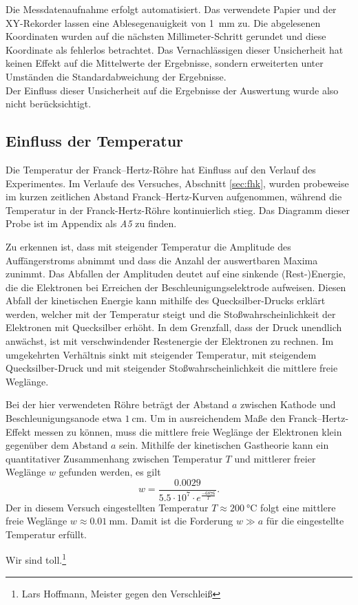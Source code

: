 Die Messdatenaufnahme erfolgt automatisiert.
Das verwendete Papier und der XY-Rekorder lassen eine Ablesegenauigkeit von \SI{1}{\milli\meter} zu.
Die abgelesenen Koordinaten wurden auf die nächsten Millimeter-Schritt gerundet und diese Koordinate als fehlerlos betrachtet.
Das Vernachlässigen dieser Unsicherheit hat keinen Effekt auf die Mittelwerte der Ergebnisse, sondern erweiterten unter Umständen die Standardabweichung der Ergebnisse.\\
Der Einfluss dieser Unsicherheit auf die Ergebnisse der Auswertung wurde also nicht berücksichtigt.

\subsection{Einfluss der Temperatur}
\label{sec:disk_temp}
Die Temperatur der Franck--Hertz-Röhre hat Einfluss auf den Verlauf des Experimentes.
Im Verlaufe des Versuches, Abschnitt \ref{sec:fhk}, wurden probeweise im kurzen zeitlichen Abstand Franck--Hertz-Kurven aufgenommen, während die Temperatur in der Franck-Hertz-Röhre kontinuierlich stieg.
Das Diagramm dieser Probe ist im Appendix als \emph{A5} zu finden.

Zu erkennen ist, dass mit steigender Temperatur die Amplitude des Auffängerstroms %
abnimmt und dass die Anzahl der auswertbaren Maxima zunimmt.
Das Abfallen der Amplituden deutet auf eine sinkende (Rest-)Energie, die die Elektronen bei Erreichen der Beschleunigungselektrode aufweisen.
Diesen Abfall der kinetischen Energie kann mithilfe des Quecksilber-Drucks erklärt werden, welcher mit der Temperatur steigt und die Stoßwahrscheinlichkeit der Elektronen mit Quecksilber erhöht.
In dem Grenzfall, dass der Druck unendlich anwächst, ist mit verschwindender Restenergie der Elektronen zu rechnen.
Im umgekehrten Verhältnis sinkt mit steigender Temperatur, mit steigendem Quecksilber-Druck und mit steigender Stoßwahrscheinlichkeit die mittlere freie Weglänge.

Bei der hier verwendeten Röhre beträgt der Abstand $a$ zwischen Kathode und Beschleunigungsanode etwa $\SI{1}{\centi\meter}$\cite{skript}.
Um in ausreichendem Maße den Franck--Hertz-Effekt messen zu können, muss die mittlere freie Weglänge der Elektronen klein gegenüber dem Abstand $a$
sein.
Mithilfe der kinetischen Gastheorie kann ein quantitativer Zusammenhang zwischen Temperatur $T$ und mittlerer freier Weglänge $w$ gefunden werden, es gilt
\begin{equation}
	w=\frac{0.0029}{5.5\cdot10^7\cdot e^{\frac{-6876}{T}}}.
\end{equation}
Der in diesem Versuch eingestellten Temperatur $T\approx\SI{200}{\degreeCelsius}$ folgt eine mittlere freie Weglänge $w\approx\SI{0.01}{\milli\meter}$. Damit ist die Forderung $w\gg a$ für die eingestellte Temperatur erfüllt.

Wir sind toll.\footnote{Lars Hoffmann, Meister gegen den Verschleiß}